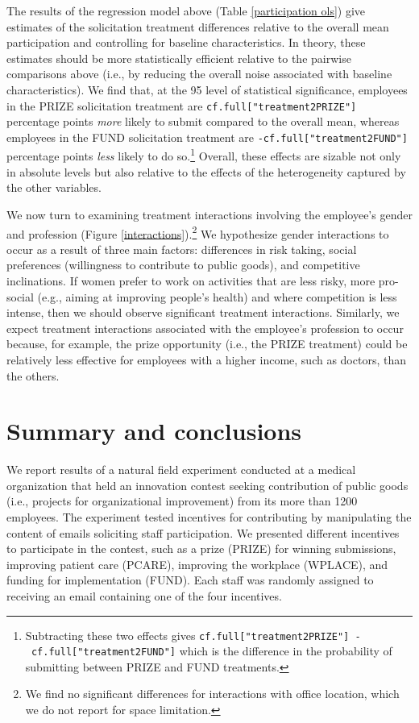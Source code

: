 \documentclass[12pt, titlepage]{article}
\begin{document}
The results of the regression model above (Table
\ref{participation ols}) give estimates of the solicitation treatment
differences relative to the overall mean participation and controlling
for baseline characteristics. In theory, these estimates should be more
statistically efficient relative to the pairwise comparisons above
(i.e., by reducing the overall noise associated with baseline
characteristics). We find that, at the 95 level of statistical
significance, employees in the PRIZE solicitation treatment are
\texttt{cf.full{[}"treatment2PRIZE"{]}} percentage points \emph{more}
likely to submit compared to the overall mean, whereas employees in the
FUND solicitation treatment are \texttt{-cf.full{[}"treatment2FUND"{]}}
percentage points \emph{less} likely to do so.\footnote{Subtracting
  these two effects gives
  \texttt{cf.full{[}"treatment2PRIZE"{]}\ -\ cf.full{[}"treatment2FUND"{]}}
  which is the difference in the probability of submitting between PRIZE
  and FUND treatments.} Overall, these effects are sizable not only in
absolute levels but also relative to the effects of the heterogeneity
captured by the other variables.

We now turn to examining treatment interactions involving the employee's
gender and profession (Figure \ref{interactions}).\footnote{We find no
  significant differences for interactions with office location, which
  we do not report for space limitation.} We hypothesize gender
interactions to occur as a result of three main factors: differences in
risk taking, social preferences (willingness to contribute to public
goods), and competitive inclinations. If women prefer to work on
activities that are less risky, more pro-social (e.g., aiming at
improving people's health) and where competition is less intense, then
we should observe significant treatment interactions. Similarly, we
expect treatment interactions associated with the employee's profession
to occur because, for example, the prize opportunity (i.e., the PRIZE
treatment) could be relatively less effective for employees with a
higher income, such as doctors, than the others.

\section{Summary and conclusions}\label{summary-and-conclusions}

We report results of a natural field experiment conducted at a medical
organization that held an innovation contest seeking contribution of
public goods (i.e., projects for organizational improvement) from its
more than 1200 employees. The experiment tested incentives for
contributing by manipulating the content of emails soliciting staff
participation. We presented different incentives to participate in the
contest, such as a prize (PRIZE) for winning submissions, improving
patient care (PCARE), improving the workplace (WPLACE), and funding for
implementation (FUND). Each staff was randomly assigned to receiving an
email containing one of the four incentives.
\end{document}

